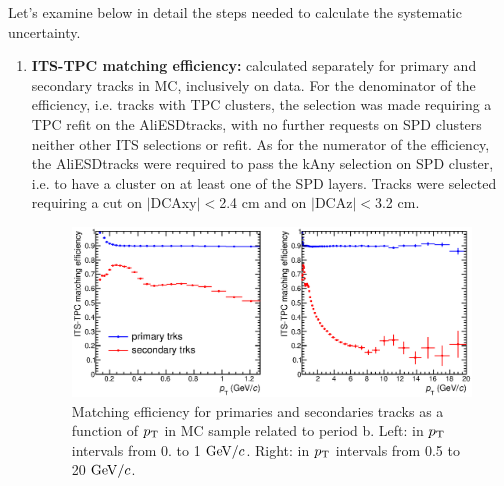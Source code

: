 Let's examine below in detail the steps needed to 
calculate the systematic uncertainty.
\begin{enumerate}
\item {\bf ITS-TPC matching efficiency:} calculated separately for 
primary and secondary tracks in MC, inclusively on data. For the denominator
of the efficiency, i.e. tracks with TPC clusters, the selection was 
made requiring a TPC refit on the AliESDtracks, with no further 
requests on SPD clusters neither other ITS selections or refit. As 
for the numerator of the efficiency, the AliESDtracks were required 
to pass the kAny selection on SPD cluster, i.e. to have a cluster 
on at least one of the SPD layers. Tracks were selected requiring 
a cut on $|$DCAxy$|<$2.4 cm and on $|$DCAz$|<$3.2 cm.
\begin{figure}[!htb]
\centering
\includegraphics[width=1\textwidth]{FigCap4/ITSTPC_matchEff_vsPt_LowFullpt.eps}
\caption{Matching efficiency for primaries and secondaries tracks as a function of $p_{\rm T}$ in MC sample related to  period b.  Left:  in $p_{\rm T}$ intervals from 0. to 1 $\mathrm{GeV}/c$. Right: in $p_{\rm T}$ intervals from 0.5 to 20 $\mathrm{GeV}/c$. }
\label{fig:matcheff_pt}
\end{figure}


\end{enumerate}
